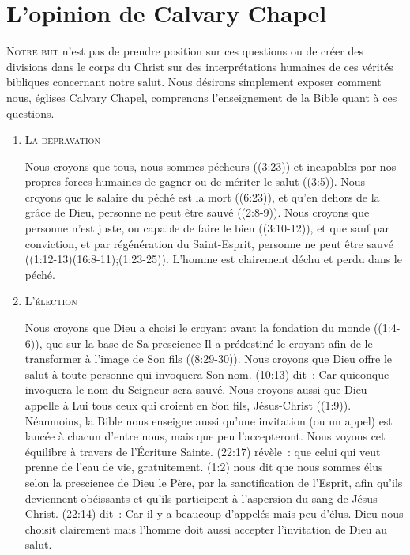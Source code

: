 \section{L'opinion de Calvary Chapel}

\lettrine{N}{otre but} n'est pas de prendre position sur ces questions
  ou de créer des divisions dans le corps du Christ
 sur des interprétations humaines de ces vérités bibliques
 concernant notre salut.
 Nous désirons simplement exposer comment nous,
 églises Calvary Chapel, comprenons l'enseignement de la Bible
 quant à ces questions.
 
\begin{enumerate}

  \item  \textsc{La dépravation}

\nobreak
Nous croyons que tous, nous sommes pécheurs ((3:23))
 et incapables par nos propres forces humaines de gagner ou
 de mériter le salut ((3:5)).
 Nous croyons que le salaire du péché est la mort ((6:23)),
 et qu'en dehors de la grâce de Dieu, personne ne peut être sauvé
 ((2:8-9)).
 Nous croyons que personne n'est juste, ou capable de faire le bien
 ((3:10-12)), et que sauf par conviction,
 et par régénération du Saint-Esprit, personne ne peut être sauvé
 ((1:12-13)(16:8-11);(1:23-25)).
 L'homme est clairement déchu et perdu dans le péché.


  \item  \textsc{L'élection}

\nobreak
Nous croyons que Dieu a choisi le croyant avant la fondation du monde
 ((1:4-6)), que sur la base de Sa prescience 
 Il a prédestiné le croyant afin de le transformer à l'image de Son fils
 ((8:29-30)).
 Nous croyons que Dieu offre le salut à toute personne qui invoquera Son nom.
 (10:13) dit~: \og Car quiconque invoquera le nom du Seigneur sera sauvé. \fg{}
 Nous croyons aussi que Dieu appelle à Lui tous ceux qui croient en Son fils,
 Jésus-Christ ((1:9)).
Néanmoins, la Bible nous enseigne aussi qu'une invitation (ou un appel)
 est lancée à chacun d'entre nous, mais que peu l'accepteront.
 Nous voyons cet équilibre à travers de l'Écriture Sainte.
 (22:17) révèle~:
 \og [\dots{}] que  celui qui veut prenne de l'eau de vie, gratuitement. \fg{}
 (1:2) nous dit que nous sommes \og élus selon la prescience de Dieu le Père,
 par la sanctification de l'Esprit, afin qu'ils deviennent obéissants et qu'ils participent
 à l'aspersion du sang de Jésus-Christ. \fg{}
 (22:14) dit~: \og Car il y a beaucoup d'appelés mais peu d'élus. \fg{}
 Dieu nous choisit clairement mais l'homme doit aussi accepter l'invitation de Dieu au salut.



\end{enumerate}
